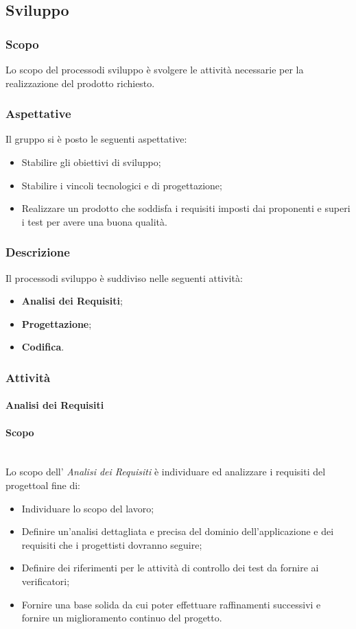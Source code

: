 \subsection{Sviluppo}
\subsubsection{Scopo}
Lo scopo del processo\glosp di sviluppo è svolgere le attività necessarie per la realizzazione del prodotto richiesto.
\subsubsection{Aspettative}
Il gruppo si è posto le seguenti aspettative:
\begin{itemize}
	\item Stabilire gli obiettivi di sviluppo;
	\item Stabilire i vincoli tecnologici e di progettazione\glo;
	\item Realizzare un prodotto che soddisfa i requisiti imposti dai proponenti e superi i test per avere una buona qualità.
\end{itemize}
\subsubsection{Descrizione}
Il processo\glosp di sviluppo è suddiviso nelle seguenti attività:
\begin{itemize}
	\item \textbf{Analisi dei Requisiti};
	\item \textbf{Progettazione};
	\item \textbf{Codifica}.
\end{itemize}
\subsubsection{Attività}
\paragraph{Analisi dei Requisiti}
\paragraph*{Scopo}\mbox{}\\ [1mm] 
Lo scopo dell' \textit{Analisi dei Requisiti} è individuare ed analizzare i requisiti del progetto\glosp al fine di:
\begin{itemize}
	\item Individuare lo scopo del lavoro;
	\item Definire un'analisi dettagliata e precisa del dominio dell'applicazione e dei requisiti che i progettisti dovranno seguire;
	\item Definire dei riferimenti per le attività di controllo dei test da fornire ai verificatori;
	\item Fornire una base solida da cui poter effettuare raffinamenti successivi e fornire un miglioramento continuo del progetto\glo.
\end{itemize}
